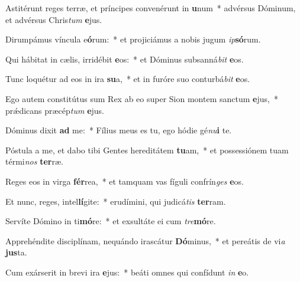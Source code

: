 \item Astitérunt reges terræ, et príncipes convenérunt in \textbf{u}num~* advérsus Dóminum, et advérsus Chris\textit{tum} \textbf{e}jus.
\item Dirumpámus víncula e\textbf{ó}rum:~* et projiciámus a nobis jugum \textit{ip}\textbf{só}rum.
\item Qui hábitat in cælis, irridébit \textbf{e}os:~* et Dóminus subsanná\textit{bit} \textbf{e}os.
\item Tunc loquétur ad eos in ira \textbf{su}a,~* et in furóre suo conturbá\textit{bit} \textbf{e}os.
\item Ego autem constitútus sum Rex ab eo super Sion montem sanctum \textbf{e}jus,~* prǽdicans præcép\textit{tum} \textbf{e}jus.
\item Dóminus dixit \textbf{ad} me:~* Fílius meus es tu, ego hódie gé\textit{nu}\textbf{i} te.
\item Póstula a me, et dabo tibi Gentes hereditátem \textbf{tu}am,~* et possessiónem tuam térmi\textit{nos} \textbf{ter}ræ.
\item Reges eos in virga \textbf{fér}rea,~* et tamquam vas fíguli confrín\textit{ges} \textbf{e}os.
\item Et nunc, reges, intel\textbf{lí}gite:~* erudímini, qui judicá\textit{tis} \textbf{ter}ram.
\item Servíte Dómino in ti\textbf{mó}re:~* et exsultáte ei cum \textit{tre}\textbf{mó}re.
\item Apprehéndite disciplínam, nequándo irascátur \textbf{Dó}minus,~* et pereátis de vi\textit{a} \textbf{jus}ta.
\item Cum exárserit in brevi ira \textbf{e}jus:~* beáti omnes qui confídunt \textit{in} \textbf{e}o.
